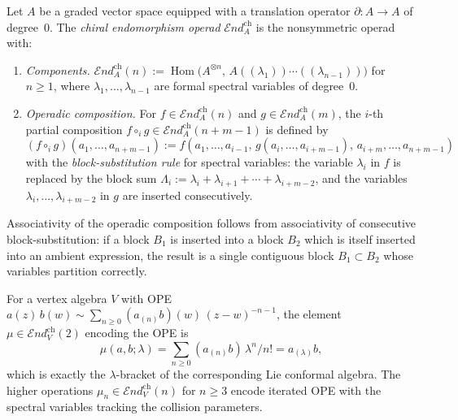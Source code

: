 \begin{definition}
\label{def:thqg-chiral-endomorphism-operad}
Let $A$ be a graded vector space equipped with a translation operator
$\partial \colon A \to A$ of degree~$0$.
The \emph{chiral endomorphism operad} $\mathcal{E}\!nd^{\mathrm{ch}}_A$
is the nonsymmetric operad with:
\begin{enumerate}[label=\textup{(\alph*)}]
\item \emph{Components.}
 $\mathcal{E}\!nd^{\mathrm{ch}}_A(n)
 := \operatorname{Hom}\bigl(A^{\otimes n},\,
 A((\lambda_1))\cdots((\lambda_{n-1}))\bigr)$
 for $n \ge 1$, where $\lambda_1, \ldots, \lambda_{n-1}$ are
 formal spectral variables of degree~$0$.

\item \emph{Operadic composition.} For $f \in \mathcal{E}\!nd^{\mathrm{ch}}_A(n)$
 and $g \in \mathcal{E}\!nd^{\mathrm{ch}}_A(m)$, the $i$-th partial
 composition $f \circ_i g \in \mathcal{E}\!nd^{\mathrm{ch}}_A(n + m - 1)$
 is defined by
 \begin{equation}\label{eq:thqg-block-composition}
 (f \circ_i g)(a_1, \ldots, a_{n+m-1})
 :=
 f(a_1, \ldots, a_{i-1},\,
 g(a_i, \ldots, a_{i+m-1}),\,
 a_{i+m}, \ldots, a_{n+m-1})
 \end{equation}
 with the \emph{block-substitution rule} for spectral variables:
 the variable $\lambda_i$ in $f$ is replaced by the block sum
 $\Lambda_i := \lambda_i + \lambda_{i+1} + \cdots + \lambda_{i+m-2}$,
 and the variables $\lambda_{i}, \ldots, \lambda_{i+m-2}$ in $g$ are
 inserted consecutively.
\end{enumerate}
Associativity of the operadic composition follows from associativity
of consecutive block-substitution: if a block $B_1$ is inserted into
a block $B_2$ which is itself inserted into an ambient expression,
the result is a single contiguous block $B_1 \subset B_2$ whose
variables partition correctly.
\end{definition}

\begin{remark}
\label{rem:thqg-ope-relation}
For a vertex algebra $V$ with OPE
$a(z)\, b(w) \sim \sum_{n \ge 0} (a_{(n)} b)(w)\, (z - w)^{-n-1}$,
the element $\mu \in \mathcal{E}\!nd^{\mathrm{ch}}_V(2)$ encoding
the OPE is
\[
\mu(a, b; \lambda)
=
\sum_{n \ge 0} (a_{(n)} b)\, \lambda^n / n!
=
a_{(\lambda)} b,
\]
which is exactly the $\lambda$-bracket of the corresponding
Lie conformal algebra. The higher operations
$\mu_n \in \mathcal{E}\!nd^{\mathrm{ch}}_V(n)$ for $n \ge 3$ encode
iterated OPE with the spectral variables tracking the collision
parameters.
\end{remark}

